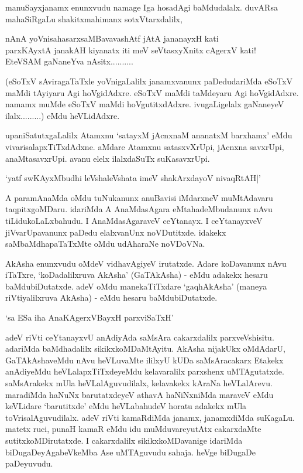 manuSayxjanamx enunxvudu namage Iga hosadAgi baMdudalalx. duvARsa mahaSiRgaLu shakitxmahimanx sotxVtarxdalilx,

\begin{shloka}
nAnA  yoVnisahasarxsaMBavavashAtf  jAtA jananayxH kati\\
parxKAyxtA janakAH kiyanatx iti meV seVtasxyXnitx cAgerxV kati!\\
EteVSAM gaNaneYva nAsitx..........
\end{shloka}

(eSoTxV sAviragaTaTxle yoVnigaLalilx janamxvanunx paDedudariMda eSoTxV maMdi tAyiyaru Agi hoVgidAdxre. eSoTxV maMdi taMdeyaru Agi hoVgidAdxre. namamx muMde eSoTxV maMdi hoVgutitxdAdxre. ivugaLigelalx gaNaneyeV ilalx.........) eMdu heVLidAdxre.

upaniSatutxgaLalilx Atamxnu `satayxM jAcnxnaM ananatxM barxhamx' eMdu vivarisalapxTiTxdAdxne. aMdare Atamxnu satasxvXrUpi, jAcnxna savxrUpi, anaMtasavxrUpi. avanu elelx ilalxdaSuTx suKasavxrUpi.

\begin{shloka}
`yatf swKAyxMbudhi leVshaleVshata imeV shakArxdayoV nivaqRtAH|'
\end{shloka}

A paramAnaMda oMdu tuNukanunx anuBavisi iMdarxneV muMtAdavaru taqpitxgoMDaru. idariMda A AnaMdasAgara eMtahadeMbudanunx nAvu tiLidukoLaLxbahudu. I AnaMdasAgaraveV ceYtanayx. I ceYtanayxveV jiVvarUpavanunx paDedu elalxvanUnx noVDutitxde. idakekx saMbaMdhapaTaTxMte oMdu udAharaNe noVDoVNa.

AkAsha enunxvudu oMdeV vidhavAgiyeV irutatxde. Adare koDavanunx nAvu iTaTxre, `koDadalilxruva AkAsha' (GaTAkAsha) - eMdu adakekx hesaru baMdubiDutatxde. adeV oMdu manekaTiTxdare `gaqhAkAsha' (maneya riVtiyalilxruva AkAsha) - eMdu hesaru baMdubiDutatxde.

\begin{shloka}
`sa ESa iha AnaKAgerxVBayxH parxviSaTxH'
\end{shloka}

adeV riVti ceYtanayxvU anAdiyAda saMsAra cakarxdalilx parxveVshisitu. adariMda baMdhadalilx sikikxkoMDaMtAyitu. AkAsha nijakUkx oMdAdarU, GaTAkAshaveMdu nAvu heVLuvaMte ililxyU kUDa saMsAracakarx Etakekx anAdiyeMdu heVLalapxTiTxdeyeMdu kelavaralilx parxshenx uMTAgutatxde. saMsArakekx mUla heVLalAguvudilalx, kelavakekx kAraNa heVLalArevu. maradiMda haNuNx barutatxdeyeV athavA haNiNxniMda maraveV eMdu keVLidare `barutitxde' eMdu heVLabahudeV horatu adakekx mUla toVrisalAguvudilalx. adeV riVti kamaRdiMda janamx, janamxdiMda suKagaLu. matetx ruci, punaH kamaR eMdu idu muMduvareyutAtx cakarxdaMte sutitxkoMDirutatxde. I cakarxdalilx sikikxkoMDavanige idariMda biDugaDeyAgabeVkeMba Ase uMTAguvudu sahaja. heVge biDugaDe paDeyuvudu.

